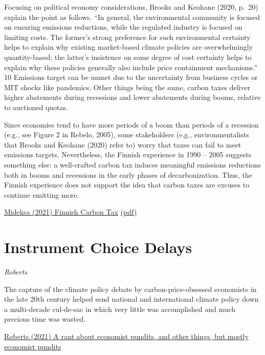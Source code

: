 \documentclass[
]{book}
\begin{document}
Focusing on political economy considerations, Brooks
and Keohane (2020, p.~20) explain the point as follows. ``In general, the environmental
community is focused on ensuring emissions reductions, while the regulated industry is
focused on limiting costs. The former's strong preference for such environmental
certainty helps to explain why existing market-based climate policies are
overwhelmingly quantity-based; the latter's insistence on some degree of cost certainty
helps to explain why these policies generally also include price containment
mechanisms.'' 10 Emissions target can be unmet due to the uncertainty from business
cycles or MIT shocks like pandemics. Other things being the same, carbon taxes deliver
higher abatements during recessions and lower abatements during booms, relative to
auctioned quotas.

Since economies tend to have more periods of a boom than periods of a
recession (e.g., see Figure 2 in Rebelo, 2005), some stakeholders (e.g., environmentalists
that Brooks and Keohane (2020) refer to) worry that taxes can fail to meet emissions
targets. Nevertheless, the Finnish experience in 1990 -- 2005 suggests something else: a
well-crafted carbon tax induces meaningful emissions reductions both in booms and
recessions in the early phases of decarbonization. Thus, the Finnish experience does not
support the idea that carbon taxes are excuses to continue emitting more.

\href{https://www.cesifo.org/en/publikationen/2021/working-paper/pricing-cooler-planet-empirical-analysis-effect-taxing-carbon}{Mideksa (2021) Finnish Carbon Tax}
\href{pdf/Mideksa_2021_Finnish_Carbon_Tax.pdf}{(pdf)}

\hypertarget{instrument-choice-delays}{%
\section{Instrument Choice Delays}\label{instrument-choice-delays}}

\emph{Roberts}

The capture of the climate policy debate by carbon-price-obsessed economists in the late 20th century helped send national and international climate policy down a multi-decade cul-de-sac in which very little was accomplished and much precious time was wasted.

\href{https://www.volts.wtf/p/a-rant-about-economist-pundits-and}{Roberts (2021) A rant about economist pundits, and other things, but mostly economist pundits}
\end{document}

